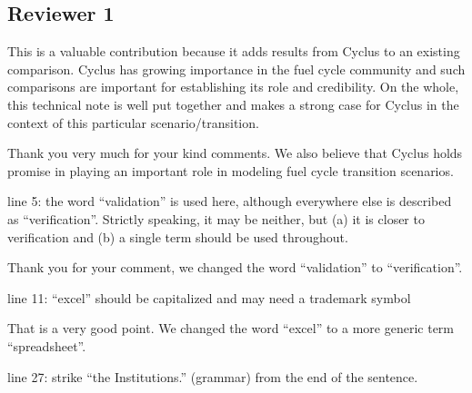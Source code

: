 \documentclass[answers,11pt]{exam}
\begin{document}
\begin{questions}
\section*{Reviewer 1}

        \question This is a valuable contribution because it adds results from 
        Cyclus to an existing comparison.  Cyclus has growing importance in the 
        fuel cycle community and such comparisons are important for 
        establishing its role and credibility.  On the whole, this technical 
        note is well put together and makes a strong case for Cyclus in the 
        context of this particular scenario/transition.

        \begin{solution}
        Thank you very much for your kind comments. We also believe that
        Cyclus holds promise in playing an important role in modeling
        fuel cycle transition scenarios.
        \end{solution}

        \question line 5: the word ``validation'' is used here, although 
        everywhere else is described as ``verification''.  Strictly speaking, 
        it may be neither, but (a) it is closer to verification and (b) a 
        single term should be used throughout.

        \begin{solution}
        Thank you for your comment, we changed the word ``validation'' to
        ``verification''.
        \end{solution}

        \question line 11: ``excel'' should be capitalized and may need a 
        trademark symbol

        \begin{solution}
        That is a very good point. We changed the word ``excel'' to a
        more generic term ``spreadsheet''.
        \end{solution}

        \question line 27: strike ``the Institutions.'' (grammar) from the end 
        of the sentence.


\end{questions}
\end{document}
